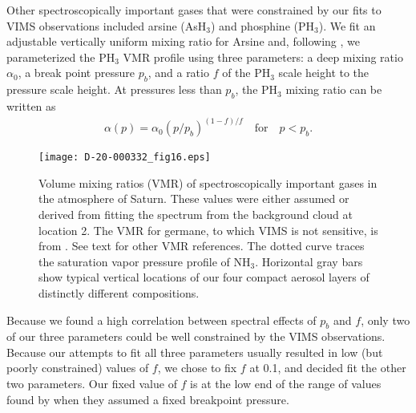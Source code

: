 \documentclass[article,11pt]{emulateapj}
\def\ashtx{AsH$_3$}
\def\pht{PH$_3$ }
\def\phtx{PH$_3$}
\def\nhtx{NH$_3$}
\begin{document}
Other spectroscopically important gases that were constrained by our fits
to VIMS observations included arsine (\ashtx) and phosphine (\phtx).
 We fit an adjustable vertically uniform
mixing ratio for Arsine and, following \cite{Fletcher2009ph3}, we parameterized
 the \pht VMR profile
using three parameters: a deep mixing ratio  $\alpha_0$, a break point pressure $p_b$,
and a ratio $f$ of the \pht scale height to the pressure scale height. 
 At pressures less than $p_b$, the \pht mixing ratio can be written
as \begin{eqnarray} \alpha(p) = \alpha_0 (p/p_b)^{(1 - f)/f} \quad
  \mathrm{for} \quad p<p_b.\label{Eq:prof1}
\end{eqnarray}

\begin{figure}[!bt]\centering
\texttt{[image: D-20-000332\_fig16.eps]}
\caption{Volume mixing ratios (VMR) of spectroscopically important gases
in the atmosphere of Saturn.  These values were either assumed
or derived from fitting the spectrum from the background cloud at
location 2. The VMR for germane, to which VIMS is not sensitive,
is from \cite{Bjoraker1986}. See text for other VMR references. The dotted curve traces the
saturation vapor pressure profile of \nhtx. Horizontal gray bars show typical vertical
locations of our four compact aerosol layers of distinctly different
compositions. }
\label{Fig:gasmix}
\end{figure}

\noindent
 Because we found a high correlation between spectral effects of $p_b$
 and $f$, only two of our three parameters could be well constrained by
 the VIMS observations. Because our attempts to fit all three
parameters usually resulted in low (but poorly constrained) values of $f$,
we chose to fix $f$ at 0.1, and decided fit the other two parameters.
   Our fixed value of $f$ is at the low end of the range
of values found by \cite{Fletcher2011vims} when they assumed a fixed
breakpoint pressure.
\end{document}
